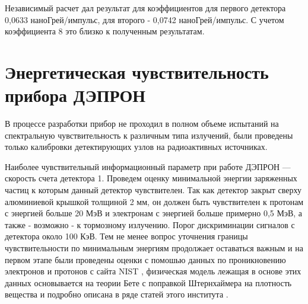 Независимый расчет дал результат для коэффициентов для первого детектора 
0,0633  наноГрей/импульс, для второго -  0,0742 наноГрей/импульс. С учетом 
коэффициента 8 это близко к полученным результатам.

\section{Энергетическая чувствительность прибора ДЭПРОН}

В процессе разработки прибор не проходил в полном объеме испытаний на 
спектральную чувствительность к различным типа излучений, были проведены только 
калибровки детектирующих узлов на радиоактивных источниках. 

Наиболее чувствительный информационный параметр при работе ДЭПРОН --- скорость 
счета детектора 1. Проведем оценку минимальной энергии заряженных частиц к которым данный детектор чувствителен. Так как детектор закрыт сверху алюминиевой крышкой толщиной 2 мм, 
он должен быть чувствителен к протонам с энергией больше 20 МэВ и электронам с 
энергией больше примерно 0,5 МэВ, а также - возможно - к тормозному излучению. 
Порог дискриминации сигналов с детектора около 100 КэВ.
Тем не менее вопрос уточнения границы чувствительности по минимальным энергиям 
продолжает оставаться важным и на первом этапе были проведены оценки с помошью 
данных  по проникновению электронов и протонов с сайта NIST \cite{NIST}, 
физическая модель  лежащая в основе этих данных основывается на теории 
Бете\cite{Bethe1930} с поправкой Штернхаймера \cite{Sternheimer1952} на 
плотность вещества  и подробно описана в 
ряде статей этого института \cite{Bichsel1992,Ashley1972}.

